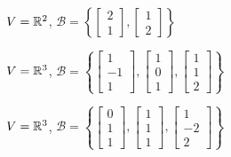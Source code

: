 \documentclass{ximera}
\begin{document}
\begin{problem}\label{GS2}
$V = \mathbb{R}^2$, $\mathcal{B} = \left\{\begin{bmatrix}2\\ 1\end{bmatrix}, \begin{bmatrix}1\\ 2\end{bmatrix}\right\}$
\end{problem}

\begin{problem}\label{GS3}
$V = \mathbb{R}^3$, $\mathcal{B} = \left\{\begin{bmatrix}1\\ -1\\ 1\end{bmatrix}, \begin{bmatrix}1\\ 0\\ 1\end{bmatrix}, \begin{bmatrix}1\\ 1\\ 2\end{bmatrix}\right\}$
\end{problem}

\begin{problem}\label{GS4}
$V = \mathbb{R}^3$, $\mathcal{B} = \left\{\begin{bmatrix}0\\ 1\\ 1\end{bmatrix}, \begin{bmatrix}1\\ 1\\ 1\end{bmatrix}, \begin{bmatrix}1\\ -2\\ 2\end{bmatrix}\right\}$

\end{problem}
\end{document}
